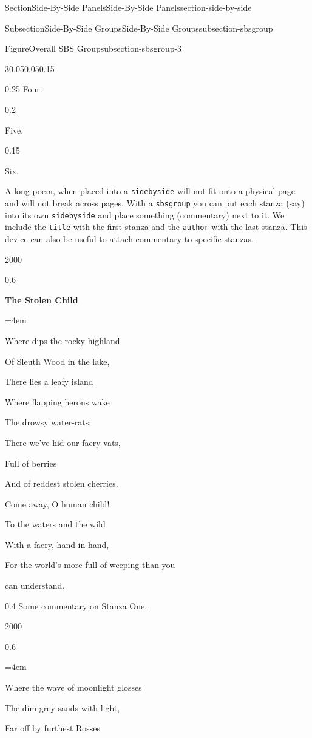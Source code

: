 \documentclass[twoside,10pt,]{article}
\newcommand{\mono}[1]{\texttt{#1}}
\numberwithin{equation}{section}
\newenvironment{poem}{\setlength{\parindent}{0em}}{}
\newcommand{\poemTitle}[1]{\begin{center}\large\textbf{#1}\end{center}}
\newenvironment{stanza}{\vspace{0.25 em}\hangindent=4em}{\vspace{1 em}}
\newcommand{\poemlineleft}[1]{{\raggedright{#1}\par}\vspace{-\parskip}}
\begin{document}
\begin{sectionptx}{Section}{Side-By-Side Panels}{}{Side-By-Side Panels}{}{}{section-side-by-side}
\begin{subsectionptx}{Subsection}{Side-By-Side Groups}{}{Side-By-Side Groups}{}{}{subsection-sbsgroup}
\begin{figureptx}{Figure}{Overall SBS Group}{subsection-sbsgroup-3}{}
\begin{sidebyside}{3}{0.05}{0.05}{0.15}
\begin{sbspanel}{0.25}%
Four.%
\end{sbspanel}%
\begin{sbspanel}{0.2}%
\par
Five.%
\end{sbspanel}%
\begin{sbspanel}{0.15}%
\par
Six.%
\end{sbspanel}%
\end{sidebyside}%
\tcblower
\end{figureptx}%
A long poem, when placed into a \mono{sidebyside} will not fit onto a physical page and will not break across pages.  With a \mono{sbsgroup} you can put each stanza (say) into its own \mono{sidebyside} and place something (commentary) next to it.  We include the \mono{title} with the first stanza and the \mono{author} with the last stanza.  This device can also be useful to attach commentary to specific stanzas.%
\begin{sidebyside}{2}{0}{0}{0}%
\begin{sbspanel}{0.6}%
\begin{poem}%
\poemTitle{The Stolen Child}
%
\begin{stanza}
\poemlineleft{Where dips the rocky highland}
\poemlineleft{Of Sleuth Wood in the lake,}
\poemlineleft{There lies a leafy island}
\poemlineleft{Where flapping herons wake}
\poemlineleft{The drowsy water-rats;}
\poemlineleft{There we've hid our faery vats,}
\poemlineleft{Full of berries}
\poemlineleft{And of reddest stolen cherries.}
\poemlineleft{Come away, O human child!}
\poemlineleft{To the waters and the wild}
\poemlineleft{With a faery, hand in hand,}
\poemlineleft{For the world's more full of weeping than you}
\poemlineleft{can understand.}
\end{stanza}
\end{poem}
\end{sbspanel}%
\begin{sbspanel}{0.4}%
Some commentary on Stanza One.%
\end{sbspanel}%
\end{sidebyside}%
\begin{sidebyside}{2}{0}{0}{0}%
\begin{sbspanel}{0.6}%
\begin{poem}%
\poemTitle{}
\begin{stanza}
\poemlineleft{Where the wave of moonlight glosses}
\poemlineleft{The dim grey sands with light,}
\poemlineleft{Far off by furthest Rosses}

\end{stanza}
\end{poem}
\end{sbspanel}
\end{sidebyside}
\end{subsectionptx}
\end{sectionptx}
\end{document}
